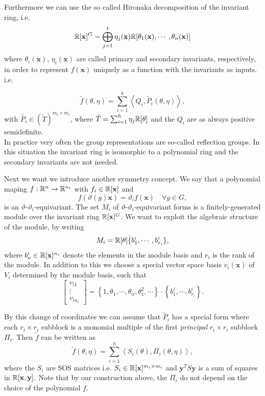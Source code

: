 \documentclass[]{article}
\begin{document}
Furthermore we can use the so called Hironaka decomposition of the invariant ring, i.e.
\[\mathbb R[\mathbf{x}]^G = \bigoplus_{j=1}^{t}\eta_j(\textbf{x})\mathbb R[\theta_1(\textbf{x}), \cdots, \theta_n(\mathbf{x})]\] 
where $\theta_i(\mathbf{x})$, $\eta_i(\mathbf{x})$ are called primary and secondary invariants, respectively, in order to represent $f(\mathbf{x})$ uniquely as a function with the invariants as inputs. i.e.

\[\tilde{f}(\theta,\eta) = \sum_{i=1}^{h}\left<Q_i,\tilde{P}_i(\theta,\eta)\right>,\] 
with $\tilde{P_i} \in (\tilde{T})^{m_i\times m_i}$, where $\tilde{T} = \sum_{i=1}^{h}\eta_j\mathbb R[\theta]$ and the $Q_i$ are as always positive semidefinite.\\

In practice very often the group representations are so-called reflection groups. In this situation the invariant ring is 
isomorphic to a polynomial ring and the secondary invariants are not needed. %

Next we want we introduce another symmetry concept. We say that a polynomial maping $f:\mathbb R^n\rightarrow \mathbb R^{n_i}$ with $f_i\in\mathbb R[\mathbf{x}]$ and 
\[ f(\vartheta(g)\mathbf{x}) =\vartheta_i f(\mathbf{x})\quad \forall g\in G, \]
is an $\vartheta$-$\vartheta_i$-equivariant. The set $M_i$ of $\vartheta$-$\vartheta_i$-equivariant forms is a finitely-generated module over
the invariant ring $\mathbb R[\mathbf{x}]^G$. We want to exploit the algebraic structure of the module, by writing 
\[M_i = \mathbb R[\theta]\dot\{b_1^i,\cdots,b_{r_i}^i\},\]
where $b_{\nu}^i\in \mathbb R[\mathbf{x}]^{n_i}$ denote the elements in the module basis and $r_i$ is the rank of the module.  In addition to this we choose a special vector space basis $v_i(\mathbf{x})$ of $V_i$ determined by the module basis, such that
\[\begin{bmatrix}v_{i1}\\ \vdots \\ v_{in_i}\end{bmatrix}= \left\{1,\theta_1,\cdots, \theta_n,\theta_1^2,\cdots\right\}\cdot\left\{b_1^i,\cdots,b_{r_i}^i\right\}.\]


By this change of coordinates we can assume that $\tilde{P}_i$ has a special form where each $r_i\times r_i$ subblock is a monomial multiple of the first \textit{principal} $r_i\times r_i$ subblock $\Pi_i$. Then $\tilde{f}$ can be written as 
\[
    \tilde{f}(\theta, \eta)=\sum_{i=1}^h\left<S_i(\theta),\Pi_i(\theta,\eta)\right>,
\]
where the $S_i$ are SOS matrices i.e. $S_i\in \mathbb R[\mathbf{x}]^{m_i\times m_i}$ and $\mathbf{y}^TS\textbf{y}$ 
is a sum of squares in $\mathbb R[\textbf{x},\textbf{y}]$. Note that by our construction above, the $\Pi_i$ do not depend on the choice of the polynomial $f$.
\end{document}
